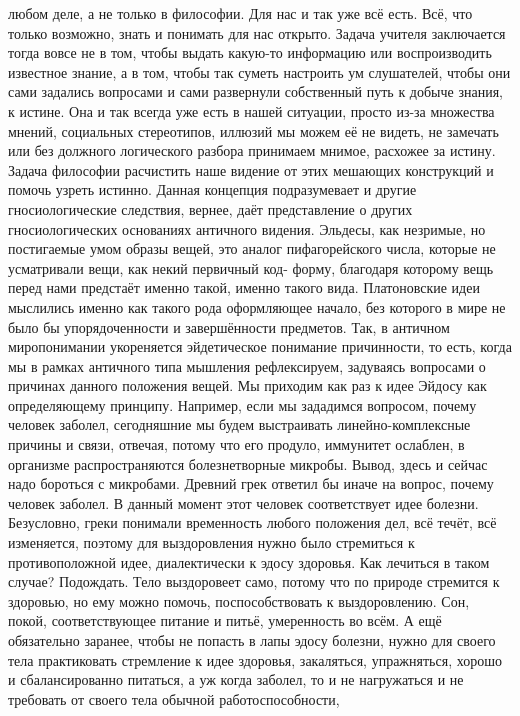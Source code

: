 любом деле, а не только в философии. Для нас и так уже всё есть. Всё, что только
возможно, знать и понимать для нас открыто. Задача учителя заключается тогда
вовсе не в том, чтобы выдать какую-то информацию или воспроизводить известное
знание, а в том, чтобы так суметь настроить ум слушателей, чтобы они сами
задались вопросами и сами развернули собственный путь к добыче знания, к истине.
Она и так всегда уже есть в нашей ситуации, просто из-за множества мнений,
социальных стереотипов, иллюзий мы можем её не видеть, не замечать или без
должного логического разбора принимаем мнимое, расхожее за истину. Задача
философии расчистить наше видение от этих мешающих конструкций и помочь узреть
истинно. Данная концепция подразумевает и другие гносиологические следствия,
вернее, даёт представление о других гносиологических основаниях античного
видения. Эльдесы, как незримые, но постигаемые умом образы вещей, это аналог
пифагорейского числа, которые не усматривали вещи, как некий первичный код-
форму, благодаря которому вещь перед нами предстаёт именно такой, именно такого
вида. Платоновские идеи мыслились именно как такого рода оформляющее начало, без
которого в мире не было бы упорядоченности и завершённости предметов. Так, в
античном миропонимании укореняется эйдетическое понимание причинности, то есть,
когда мы в рамках античного типа мышления рефлексируем, задуваясь вопросами о
причинах данного положения вещей. Мы приходим как раз к идее Эйдосу как
определяющему принципу. Например, если мы зададимся вопросом, почему человек
заболел, сегодняшние мы будем выстраивать линейно-комплексные причины и связи,
отвечая, потому что его продуло, иммунитет ослаблен, в организме
распространяются болезнетворные микробы. Вывод, здесь и сейчас надо бороться с
микробами. Древний грек ответил бы иначе на вопрос, почему человек заболел. В
данный момент этот человек соответствует идее болезни. Безусловно, греки
понимали временность любого положения дел, всё течёт, всё изменяется, поэтому
для выздоровления нужно было стремиться к противоположной идее, диалектически к
эдосу здоровья. Как лечиться в таком случае? Подождать. Тело выздоровеет само,
потому что по природе стремится к здоровью, но ему можно помочь,
поспособствовать к выздоровлению. Сон, покой, соответствующее питание и питьё,
умеренность во всём. А ещё обязательно заранее, чтобы не попасть в лапы эдосу
болезни, нужно для своего тела практиковать стремление к идее здоровья,
закаляться, упражняться, хорошо и сбалансированно питаться, а уж когда заболел,
то и не нагружаться и не требовать от своего тела обычной работоспособности,

